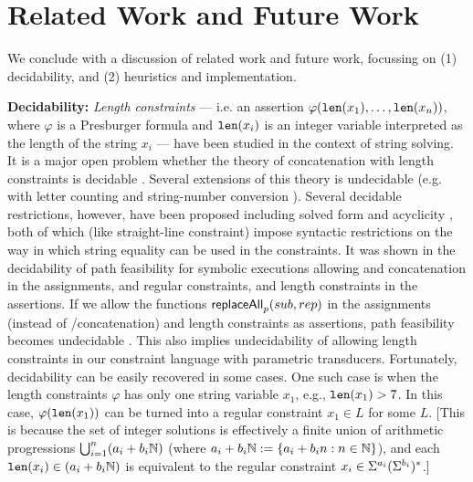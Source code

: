 \section{Related Work and Future Work}
\label{sec:related}

We conclude with a discussion of related work and future work, focussing on
(1) decidability, and (2) heuristics and implementation.

\smallskip
\noindent
\textbf{Decidability:}
\emph{Length constraints} --- i.e. an assertion 
$\varphi(\texttt{len}(x_1),\ldots,\texttt{len}(x_n))$, where $\varphi$ is a Presburger formula
and $\texttt{len}(x_i)$ is an integer variable interpreted as the length of the string
$x_i$ --- have been studied in the context of string solving. It is
a major open problem whether the theory of concatenation with length
constraints is decidable \cite{Vijay-length}. Several extensions of this 
theory is undecidable (e.g. with letter counting \cite{buchi} and
string-number conversion \cite{GB16}).
Several decidable restrictions, however,
have been proposed including solved form \cite{Vijay-length} and acyclicity 
\cite{Abdulla14}, both of which (like straight-line constraint) impose 
syntactic restrictions on the way in which string equality can be
used in the constraints. It was shown in \cite{LB16} the decidability of path 
feasibility for symbolic
executions allowing \FT{} and concatenation in the 
assignments, and regular constraints, and length constraints 
in the assertions. If we allow the functions
$\mathsf{replaceAll}_p(sub,rep)$ in the assignments (instead of
\FT{}/concatenation) and length constraints as assertions, path
feasibility becomes undecidable \cite{CCHLW18}. This also implies undecidability
of allowing length constraints in our constraint language with parametric
transducers. Fortunately, decidability can be easily recovered in some
cases. One such case is when the length constraints $\varphi$ has only
one string variable $x_1$, e.g., $\texttt{len}(x_1) > 7$. In this case,
$\varphi(\texttt{len}(x_1))$ can be turned into a regular constraint $x_1 \in L$ for
some $L$. [This is because the set of integer solutions is effectively
a finite union of arithmetic progressions $\bigcup_{i=1}^n (a_i + b_i\mathbb{N})$
(where $a_i + b_i\mathbb{N} := \{ a_i + b_in : n \in \mathbb{N}\}$), and each 
$\texttt{len}(x_i) \in (a_i + b_i\mathbb{N})$ is equivalent to the regular constraint 
$x_i \in \Sigma^{a_i} (\Sigma^{b_i})^*$.] 

